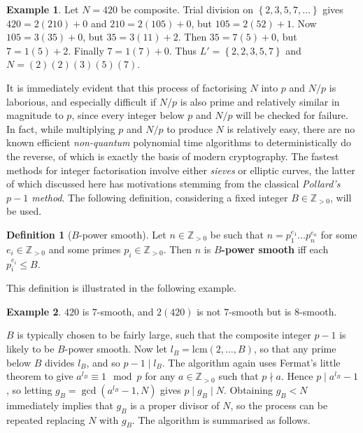 \documentclass{article}
\newcommand{\Z}{\mathbb{Z}}
\newcommand{\rb}[1]{\left( #1 \right)}
\newcommand{\cb}[1]{\left\{ #1 \right\}}
\theoremstyle{definition}
\newtheorem*{definition}{Definition}
\newtheorem*{example}{Example}
\begin{document}
\begin{example}
Let $ N = 420 $ be composite. Trial division on $ \cb{2, 3, 5, 7, \dots} $ gives $ 420 = 2\rb{210} + 0 $ and $ 210 = 2\rb{105} + 0 $, but $ 105 = 2\rb{52} + 1 $. Now $ 105 = 3\rb{35} + 0 $, but $ 35 = 3\rb{11} + 2 $. Then $ 35 = 7\rb{5} + 0 $, but $ 7 = 1\rb{5} + 2 $. Finally $ 7 = 1\rb{7} + 0 $. Thus $ L' = \cb{2, 2, 3, 5, 7} $ and $ N = \rb{2}\rb{2}\rb{3}\rb{5}\rb{7} $.
\end{example}

It is immediately evident that this process of factorising $ N $ into $ p $ and $ N / p $ is laborious, and especially difficult if $ N / p $ is also prime and relatively similar in magnitude to $ p $, since every integer below $ p $ and $ N / p $ will be checked for failure. In fact, while multiplying $ p $ and $ N / p $ to produce $ N $ is relatively easy, there are no known efficient \emph{non-quantum} polynomial time algorithms to deterministically do the reverse, of which is exactly the basis of modern cryptography. The fastest methods for integer factorisation involve either \emph{sieves} or elliptic curves, the latter of which discussed here has motivations stemming from the classical \emph{Pollard's $ p - 1 $ method}. The following definition, considering a fixed integer $ B \in \Z_{> 0} $, will be used.

\begin{definition}[$ B $-power smooth]
Let $ n \in \Z_{> 0} $ be such that $ n = p_1^{e_1} \dots p_n^{e_n} $ for some $ e_i \in \Z_{> 0} $ and some primes $ p_i \in \Z_{> 0} $. Then $ n $ is \textbf{$ B $-power smooth} iff each $ p_i^{e_i} \le B $.
\end{definition}

This definition is illustrated in the following example.

\begin{example}
$ 420 $ is $ 7 $-smooth, and $ 2\rb{420} $ is not $ 7 $-smooth but is $ 8 $-smooth.
\end{example}

$ B $ is typically chosen to be fairly large, such that the composite integer $ p - 1 $ is likely to be $ B $-power smooth. Now let $ l_B = \text{lcm}\rb{2, \dots, B} $, so that any prime below $ B $ divides $ l_B $, and so $ p - 1 \mid l_B $. The algorithm again uses Fermat's little theorem to give $ a^{l_B} \equiv 1 \mod p $ for any $ a \in \Z_{> 0} $ such that $ p \nmid a $. Hence $ p \mid a^{l_B} - 1 $, so letting $ g_B = \gcd\rb{a^{l_B} - 1, N} $ gives $ p \mid g_B \mid N $. Obtaining $ g_B < N $ immediately implies that $ g_B $ is a proper divisor of $ N $, so the process can be repeated replacing $ N $ with $ g_B $. The algorithm is summarised as follows.
\end{document}

